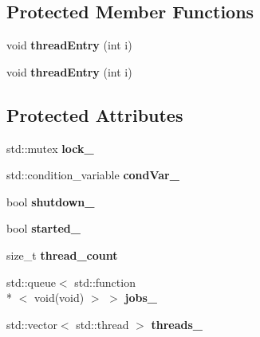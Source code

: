\subsection*{Protected Member Functions}
\begin{DoxyCompactItemize}
\item 
\hypertarget{classatl_1_1_thread_pool_ab442364a73d9184b4f0adfd3f47ea2fb}{void {\bfseries thread\+Entry} (int i)}\label{classatl_1_1_thread_pool_ab442364a73d9184b4f0adfd3f47ea2fb}

\item 
\hypertarget{classatl_1_1_thread_pool_ab442364a73d9184b4f0adfd3f47ea2fb}{void {\bfseries thread\+Entry} (int i)}\label{classatl_1_1_thread_pool_ab442364a73d9184b4f0adfd3f47ea2fb}

\end{DoxyCompactItemize}
\subsection*{Protected Attributes}
\begin{DoxyCompactItemize}
\item 
\hypertarget{classatl_1_1_thread_pool_a402283160a126b60093c4304f3007458}{std\+::mutex {\bfseries lock\+\_\+}}\label{classatl_1_1_thread_pool_a402283160a126b60093c4304f3007458}

\item 
\hypertarget{classatl_1_1_thread_pool_a4e5d8a799ea40e346a83d5877ae67cbb}{std\+::condition\+\_\+variable {\bfseries cond\+Var\+\_\+}}\label{classatl_1_1_thread_pool_a4e5d8a799ea40e346a83d5877ae67cbb}

\item 
\hypertarget{classatl_1_1_thread_pool_a44df4799943e50ea24f1a036ff3db2f6}{bool {\bfseries shutdown\+\_\+}}\label{classatl_1_1_thread_pool_a44df4799943e50ea24f1a036ff3db2f6}

\item 
\hypertarget{classatl_1_1_thread_pool_a44aba02e981bdb14f52f8ef364b0cc65}{bool {\bfseries started\+\_\+}}\label{classatl_1_1_thread_pool_a44aba02e981bdb14f52f8ef364b0cc65}

\item 
\hypertarget{classatl_1_1_thread_pool_a783028a9da8da6892c76667b163f084e}{size\+\_\+t {\bfseries thread\+\_\+count}}\label{classatl_1_1_thread_pool_a783028a9da8da6892c76667b163f084e}

\item 
\hypertarget{classatl_1_1_thread_pool_af27763f5a3533a7280ffbb929864081e}{std\+::queue$<$ std\+::function\\*
$<$ void(void) $>$ $>$ {\bfseries jobs\+\_\+}}\label{classatl_1_1_thread_pool_af27763f5a3533a7280ffbb929864081e}

\item 
\hypertarget{classatl_1_1_thread_pool_a15e4c898954139d882304533e7b245d4}{std\+::vector$<$ std\+::thread $>$ {\bfseries threads\+\_\+}}\label{classatl_1_1_thread_pool_a15e4c898954139d882304533e7b245d4}

\end{DoxyCompactItemize}


